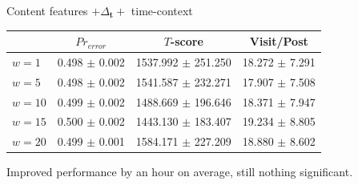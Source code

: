 \documentclass[12pt]{presentation}
\begin{document}
\begin{frame}{Content features $+ \Delta_\mathbf{t} + $ time-context}
	\begin{center}
		\footnotesize
		\begin{tabular}{ | l | c | c | c | }
			\hline
		& $Pr_{error}$		  & $T$-score			   &	Visit/Post\\
			\hline
 $w=1$ &	0.498 $\pm$ 0.002 &	1537.992 $\pm$ 251.250 &  	18.272 $\pm$ 7.291 \\
 $w=5$ &	0.498 $\pm$ 0.002 &	1541.587 $\pm$ 232.271 &  	17.907 $\pm$ 7.508 \\
$w=10$ &	0.499 $\pm$ 0.002 &	1488.669 $\pm$ 196.646 &  	18.371 $\pm$ 7.947 \\
\rowcolor{green}
$w=15$ &	0.500 $\pm$ 0.002 &	1443.130 $\pm$ 183.407 &  	19.234 $\pm$ 8.805 \\
$w=20$ &	0.499 $\pm$ 0.001 &	1584.171 $\pm$ 227.209 &  	18.880 $\pm$ 8.602 \\
			\hline
		\end{tabular}
	\end{center}
	Improved performance by an hour on average, still nothing significant.
\end{frame}
\end{document}
